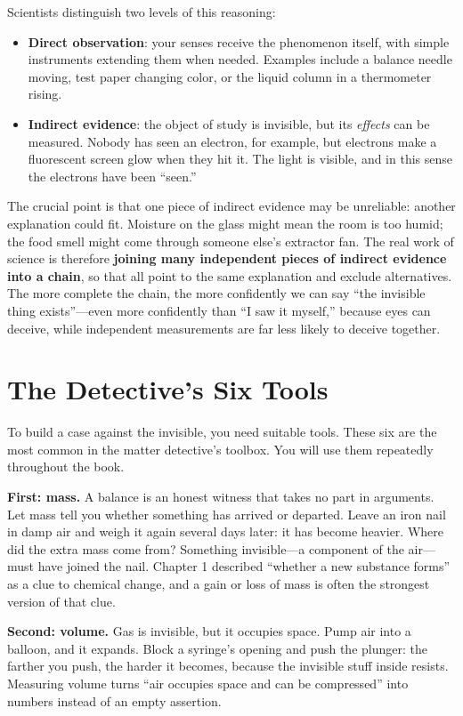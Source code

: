 Scientists distinguish two levels of this reasoning:

\begin{itemize}[itemsep=2pt]
\item \textbf{Direct observation}: your senses receive the phenomenon itself, with simple instruments extending them when needed. Examples include a balance needle moving, test paper changing color, or the liquid column in a thermometer rising.
\item \textbf{Indirect evidence}: the object of study is invisible, but its \emph{effects} can be measured. Nobody has seen an electron, for example, but electrons make a fluorescent screen glow when they hit it. The light is visible, and in this sense the electrons have been ``seen.''
\end{itemize}

The crucial point is that one piece of indirect evidence may be unreliable: another explanation could fit. Moisture on the glass might mean the room is too humid; the food smell might come through someone else's extractor fan. The real work of science is therefore \textbf{joining many independent pieces of indirect evidence into a chain}, so that all point to the same explanation and exclude alternatives. The more complete the chain, the more confidently we can say ``the invisible thing exists''---even more confidently than ``I saw it myself,'' because eyes can deceive, while independent measurements are far less likely to deceive together.

\section{The Detective's Six Tools}

To build a case against the invisible, you need suitable tools. These six are the most common in the matter detective's toolbox. You will use them repeatedly throughout the book.

\textbf{First: mass.} A balance is an honest witness that takes no part in arguments. Let mass tell you whether something has arrived or departed. Leave an iron nail in damp air and weigh it again several days later: it has become heavier. Where did the extra mass come from? Something invisible---a component of the air---must have joined the nail. Chapter 1 described ``whether a new substance forms'' as a clue to chemical change, and a gain or loss of mass is often the strongest version of that clue.

\textbf{Second: volume.} Gas is invisible, but it occupies space. Pump air into a balloon, and it expands. Block a syringe's opening and push the plunger: the farther you push, the harder it becomes, because the invisible stuff inside resists. Measuring volume turns ``air occupies space and can be compressed'' into numbers instead of an empty assertion.

